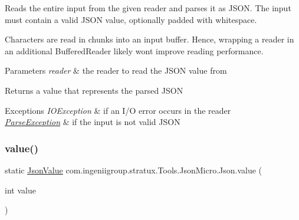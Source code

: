 Reads the entire input from the given reader and parses it as J\+S\+ON. The input must contain a valid J\+S\+ON value, optionally padded with whitespace. 

Characters are read in chunks into an input buffer. Hence, wrapping a reader in an additional {\ttfamily Buffered\+Reader} likely won\textquotesingle{}t improve reading performance. 


\begin{DoxyParams}{Parameters}
{\em reader} & the reader to read the J\+S\+ON value from \\
\hline
\end{DoxyParams}
\begin{DoxyReturn}{Returns}
a value that represents the parsed J\+S\+ON 
\end{DoxyReturn}

\begin{DoxyExceptions}{Exceptions}
{\em I\+O\+Exception} & if an I/O error occurs in the reader \\
\hline
{\em \hyperlink{classcom_1_1ingeniigroup_1_1stratux_1_1_tools_1_1_json_micro_1_1_parse_exception}{Parse\+Exception}} & if the input is not valid J\+S\+ON \\
\hline
\end{DoxyExceptions}
\mbox{\label{classcom_1_1ingeniigroup_1_1stratux_1_1_tools_1_1_json_micro_1_1_json_aa7a17dbf2bbb667284cb5a86d404bf6d}} 
\subsubsection{\texorpdfstring{value()}{value()}\hspace{0.1cm}{\footnotesize\ttfamily [1/6]}}
{\footnotesize\ttfamily static \hyperlink{classcom_1_1ingeniigroup_1_1stratux_1_1_tools_1_1_json_micro_1_1_json_value}{Json\+Value} com.\+ingeniigroup.\+stratux.\+Tools.\+Json\+Micro.\+Json.\+value (\begin{DoxyParamCaption}\item[{int}]{value }\end{DoxyParamCaption})\hspace{0.3cm}{\ttfamily [static]}}

